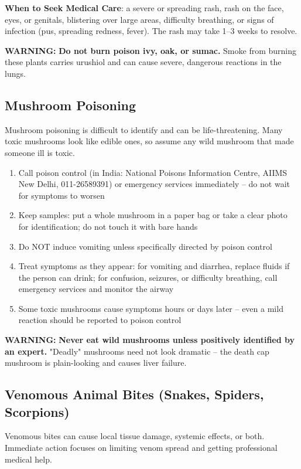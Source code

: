 \textbf{When to Seek Medical Care}: a severe or spreading rash, rash on the face, eyes, or genitals, blistering over large areas, difficulty breathing, or signs of infection (pus, spreading redness, fever). The rash may take 1--3 weeks to resolve.

\textbf{WARNING:} \textbf{Do not burn poison ivy, oak, or sumac.} Smoke from burning these plants carries urushiol and can cause severe, dangerous reactions in the lungs.

\subsection{Mushroom Poisoning}

Mushroom poisoning is difficult to identify and can be life-threatening. Many toxic mushrooms look like edible ones, so assume any wild mushroom that made someone ill is toxic.

\begin{enumerate}[leftmargin=*]
\item Call poison control (in India: National Poisons Information Centre, AIIMS New Delhi, 011-26589391) or emergency services immediately -- do not wait for symptoms to worsen
\item Keep samples: put a whole mushroom in a paper bag or take a clear photo for identification; do not touch it with bare hands
\item Do NOT induce vomiting unless specifically directed by poison control
\item Treat symptoms as they appear: for vomiting and diarrhea, replace fluids if the person can drink; for confusion, seizures, or difficulty breathing, call emergency services and monitor the airway
\item Some toxic mushrooms cause symptoms hours or days later -- even a mild reaction should be reported to poison control
\end{enumerate}

\textbf{WARNING:} \textbf{Never eat wild mushrooms unless positively identified by an expert.} "Deadly" mushrooms need not look dramatic -- the death cap mushroom is plain-looking and causes liver failure.

\subsection{Venomous Animal Bites (Snakes, Spiders, Scorpions)}

Venomous bites can cause local tissue damage, systemic effects, or both. Immediate action focuses on limiting venom spread and getting professional medical help.

